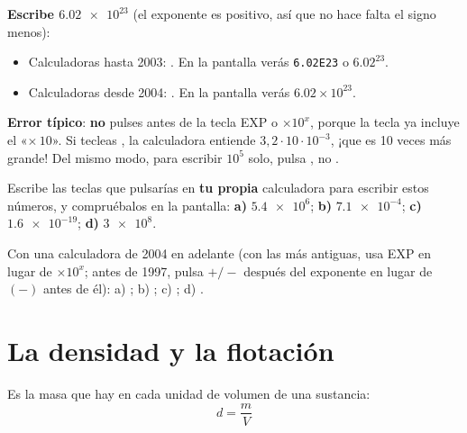 \begin{example}
    \textbf{Escribe \(\num{6.02e23}\)} (el exponente es positivo, así que no hace falta el signo menos):
    \begin{itemize}
        \item Calculadoras hasta 2003: . En la pantalla verás \texttt{6.02E23} o \(6.02^{23}\).
        \item Calculadoras desde 2004: . En la pantalla verás \(6.02 \times 10^{23}\).
    \end{itemize}
\end{example}

\begin{marker}
    \textbf{Error típico}: \textbf{no} pulses  antes de la tecla EXP o \(\times 10^{x}\), porque la tecla ya incluye el «\(\times\,10\)». Si tecleas , la calculadora entiende \(3{,}2 \cdot 10 \cdot 10^{-3}\), ¡que es 10 veces más grande! Del mismo modo, para escribir \(10^{5}\) solo, pulsa , no .
\end{marker}

\begin{exercise}
    Escribe las teclas que pulsarías en \textbf{tu propia} calculadora para escribir estos números, y compruébalos en la pantalla: \textbf{a)} \(\num{5.4e6}\); \textbf{b)} \(\num{7.1e-4}\); \textbf{c)} \(\num{1.6e-19}\); \textbf{d)} \(\num{3e8}\).
    \begin{solu}
        Con una calculadora de 2004 en adelante (con las más antiguas, usa EXP en lugar de \(\times 10^{x}\); antes de 1997, pulsa \(+/-\) después del exponente en lugar de \((-)\) antes de él):
        a) ; b) ; c) ; d) .
    \end{solu}
\end{exercise}


\section{La densidad y la flotación}


\begin{definition}[Densidad]
    Es la masa que hay en cada unidad de volumen de una sustancia:
    \begin{equation*}
        d = \dfrac{m}{V}
    \end{equation*}
\end{definition}

